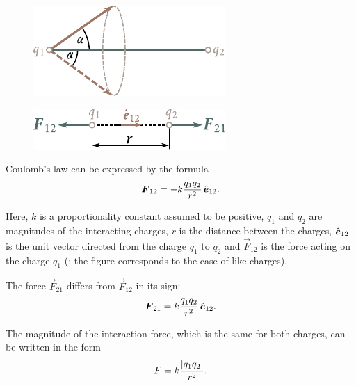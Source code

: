 \begin{figure}[t]
	\begin{minipage}[t]{0.5\linewidth}
		\begin{center}
			\includegraphics[scale=1]{figures/ch_01/fig_1_2.pdf}
			\caption[]{}
			\label{fig:1_2}
		\end{center}
	\end{minipage}
	\hfill{ }%
	\begin{minipage}[t]{0.5\linewidth}
		\begin{center}
			\includegraphics[scale=1]{figures/ch_01/fig_1_3.pdf}
			\caption[]{}
			\label{fig:1_3}
		\end{center}
	\end{minipage}
\vspace{-0.4cm}
\end{figure}

Coulomb's law can be expressed by the formula
\begin{equation}\label{eq:1_2}
	\boldsymbol{F}_{12} = -k \frac{q_1 q_2}{r^2}\,\hat{\boldsymbol{e}}_{12}.
\end{equation}

\noindent
Here, $k$ is a proportionality constant assumed to be positive, $q_1$ and $q_2$ are magnitudes of the interacting charges, $r$ is the distance between the charges, $\hat{\boldsymbol{e}}_{12}$ is the unit vector directed from the charge $q_1$ to $q_2$ and $\vec{F}_{12}$ is the force acting on the charge $q_1$ (; the figure corresponds to the case of like charges).

The force $\vec{F}_{21}$ differs from $\vec{F}_{12}$ in its sign:
\begin{equation}\label{eq:1_3}
	\boldsymbol{F}_{21} = k \frac{q_1 q_2}{r^2}\,\hat{\boldsymbol{e}}_{12}.
\end{equation}

The magnitude of the interaction force, which is the same for both charges, can be written in the form
\begin{equation}\label{eq:1_4}
	F = k \frac{\left| q_1 q_2 \right|}{r^2}.
\end{equation}

